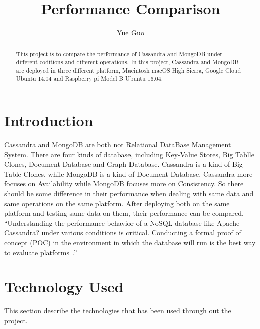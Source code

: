 
\title{Performance Comparison}

\author{Yue Guo}

\begin{abstract}
This project is to compare the performance of Cassandra and MongoDB 
under different coditions and different operations. In this project, Cassandra
 and MongoDB are deployed in three different platform, Macintosh macOS 
 High Sierra, Google Cloud Ubuntu 14.04 and Raspberry pi Model B Ubuntu 
 16.04.
\end{abstract}



\maketitle


\section{Introduction}
Cassandra and MongoDB are both not Relational DataBase Management System. 
There are four kinds of database, including Key-Value Stores, Big Tablle 
Clones, Document Database and Graph Database. Cassandra is a kind of Big 
Table Clones, while MongoDB is a kind of Document Database. Cassandra more 
focuses on Availability while MongoDB focuses more on Consistency. So there
 should be some difference in their performance when dealing with same data 
 and same operations on the same platform. After deploying both on the same 
 platform and testing same data on them, their performance can be compared. 
 ``Understanding the performance behavior of a NoSQL database like Apache 
 Cassandra? under various conditions is critical. Conducting a formal proof 
 of concept (POC) in the environment in which the database will run is the 
 best way to evaluate platforms~\cite{hid-sp18-508-benchmarking}.''

\section{Technology Used}
This section describe the technologies that has been used through out 
the project.

